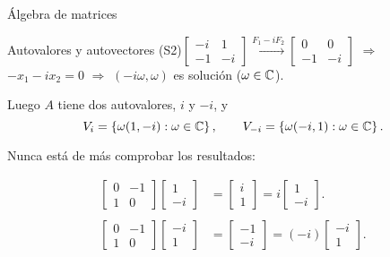 \begin{chapter}{\'Algebra de matrices}
\begin{section}{Autovalores y autovectores}
        (S2)\quad  $\begin{bmatrix}    -i&1 \\ -1&-i\end{bmatrix} \stackrel{F_1 -i F_2}{\longrightarrow}\begin{bmatrix}    0&0 \\ -1&-i\end{bmatrix}$  $\Rightarrow$ $-x_1-i x_2=0$ $\Rightarrow$ $(-i \omega,\omega)$ es solución ($\omega \in \mathbb C$).


        Luego $A$ tiene dos autovalores, $i$ y $-i$, y 
    \begin{equation*}
        V_i = \left\{ \omega(1, -i): \omega\in \mathbb C \right\}, \qquad  V_{-i} = \left\{ \omega(-i,1): \omega\in \mathbb C \right\}.
    \end{equation*} 
        
        Nunca está de más comprobar los resultados:
    
        \begin{align*}
            \begin{bmatrix}0&-1\\1&0\end{bmatrix}\begin{bmatrix}1\\-i\end{bmatrix} &= \begin{bmatrix}i\\1\end{bmatrix} = i \begin{bmatrix}1\\-i\end{bmatrix}.\\
            \\
            \begin{bmatrix}0&-1\\1&0\end{bmatrix}\begin{bmatrix}-i\\1\end{bmatrix} &= \begin{bmatrix}-1\\-i\end{bmatrix} = (-i) \begin{bmatrix}-i\\1\end{bmatrix}.
        \end{align*}


\end{section}
\end{chapter}
